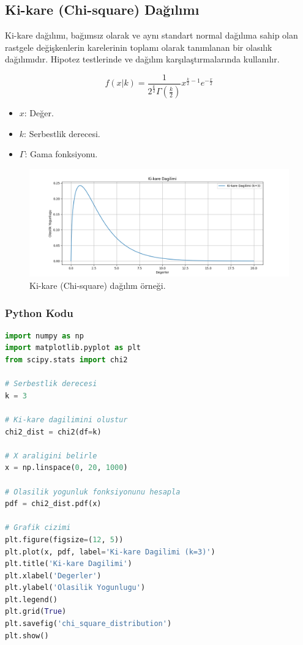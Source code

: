 \newpage

\subsection{Ki-kare (Chi-square) Dağılımı}
Ki-kare dağılımı, bağımsız olarak ve aynı standart normal dağılıma sahip olan rastgele değişkenlerin karelerinin toplamı olarak tanımlanan bir olasılık dağılımıdır. Hipotez testlerinde ve dağılım karşılaştırmalarında kullanılır.

\[f(x|k) = \frac{1}{2^{\frac{k}{2}} \Gamma\left(\frac{k}{2}\right)} x^{\frac{k}{2} - 1} e^{-\frac{x}{2}}\]
\begin{itemize}
	\item $x$: Değer.
	\item $k$: Serbestlik derecesi.
	\item $\Gamma$: Gama fonksiyonu.
\end{itemize}

\begin{figure}[h]
    \centering
    \includegraphics[width=1\textwidth]{images/chi_square_distribution.png}
    \caption{Ki-kare (Chi-square) dağılım örneği.}
    \label{fig:enter-label}
\end{figure}

\subsubsection{Python Kodu}

\begin{lstlisting}[language=Python]
import numpy as np
import matplotlib.pyplot as plt
from scipy.stats import chi2

# Serbestlik derecesi
k = 3

# Ki-kare dagilimini olustur
chi2_dist = chi2(df=k)

# X araligini belirle
x = np.linspace(0, 20, 1000)

# Olasilik yogunluk fonksiyonunu hesapla
pdf = chi2_dist.pdf(x)

# Grafik cizimi
plt.figure(figsize=(12, 5))
plt.plot(x, pdf, label='Ki-kare Dagilimi (k=3)')
plt.title('Ki-kare Dagilimi')
plt.xlabel('Degerler')
plt.ylabel('Olasilik Yogunlugu')
plt.legend()
plt.grid(True)
plt.savefig('chi_square_distribution')
plt.show()
\end{lstlisting}


